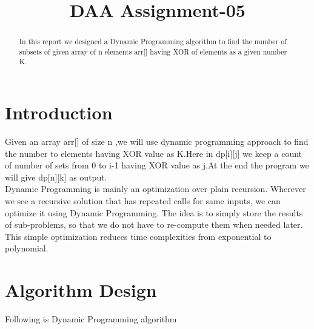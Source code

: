 \documentclass[conference]{IEEEtran}
\begin{document}
\title{DAA Assignment-05\\
}

\author{
\and
{}
\and
{}
}

\maketitle

\begin{abstract}
In this report we designed a Dynamic Programming algorithm to find the number of subsets of given array of n elements arr[] having XOR of elements as a given number K.

\end{abstract}

\section{Introduction}
Given an array arr[] of size n ,we will use dynamic programming approach to find the number to elements having XOR value as K.Here in dp[i][j] we keep a count of number of sets from 0 to i-1 having XOR value as j.At the end the program we will give dp[n][k] as output.\\
Dynamic Programming is mainly an optimization over plain recursion. Wherever we see a recursive solution that has repeated calls for same inputs, we can optimize it using Dynamic Programming. The idea is to simply store the results of sub-problems, so that we do not have to re-compute them when needed later. This simple optimization reduces time complexities from exponential to polynomial.


\section{Algorithm Design}
Following is Dynamic Programming algorithm


  
\end{document}
